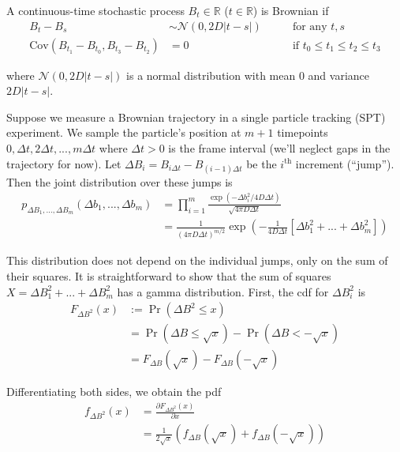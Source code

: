 \documentclass{article}
\begin{document}
A continuous-time stochastic process $B_{t} \in \mathbb{R}$ ($t \in \mathbb{R}$) is Brownian if
\begin{align}
    B_{t} - B_{s} &\sim \mathcal{N} \left( 0, 2 D \left| t - s \right| \right) \qquad &\text{for any $t, s$} \label{eq:rule1} \\
    \text{Cov} \left( B_{t_{1}} - B_{t_{0}}, B_{t_{3}} - B_{t_{2}} \right) &= 0 \qquad &\text{if $t_{0} \leq t_{1} \leq t_{2} \leq t_{3}$} \label{eq:rule2}
\end{align}

where $\mathcal{N} \left( 0, 2 D \left| t - s \right| \right)$ is a normal distribution
with mean 0 and variance $2 D \left| t - s \right|$. \newline

Suppose we measure a Brownian trajectory in a single particle tracking (SPT) experiment.
We sample the particle's position at $m+1$ timepoints
$0, \Delta t, 2 \Delta t, ..., m \Delta t$ where $\Delta t > 0$ is the
frame interval (we'll neglect gaps in the trajectory for now).
Let $\Delta B_{i} = B_{i \Delta t} - B_{(i-1) \Delta t}$ be the
$i^{\text{th}}$ increment (``jump''). Then the joint distribution over
these jumps is
\begin{align*}
    p_{\Delta B_{1}, ..., \Delta B_{m}} \left( \Delta b_{1}, ..., \Delta b_{m} \right) &= \prod\limits_{i=1}^{m} \frac{ \exp \left( - \Delta b_{i}^{2} / 4 D \Delta t \right) }{ \sqrt{ 4 \pi D \Delta t } } \\
    &= \frac{1}{\left( 4 \pi D \Delta t \right)^{m/2}} \exp \left( - \frac{1}{4 D \Delta t} \left[ \Delta b_{1}^{2} + ... + \Delta b_{m}^{2} \right] \right)
\end{align*}

This distribution does not depend on the individual jumps,
only on the sum of their squares. It is straightforward to
show that the sum of squares $X = \Delta B_{1}^{2} + ... + \Delta B_{m}^{2}$
has a gamma distribution. First, the cdf for $\Delta B_{i}^{2}$ is
\begin{align*}
    F_{\Delta B^{2}} \left( x \right) &:= \Pr \left( \Delta B^{2} \leq x \right) \\
    &= \Pr \left( \Delta B \leq \sqrt{x} \right) - \Pr \left( \Delta B < -\sqrt{x} \right) \\
    &= F_{\Delta B} \left( \sqrt{x} \right) - F_{\Delta B} \left( - \sqrt{x} \right)
\end{align*}

Differentiating both sides, we obtain the pdf
\begin{align*}
    f_{\Delta B^{2}}(x) &= \frac{\partial F_{\Delta B^{2}}(x)}{\partial x} \\
    &= \frac{1}{2 \sqrt{x}} \left(
        f_{\Delta B} \left( \sqrt{x} \right) + f_{\Delta B} \left( - \sqrt{x} \right)
    \right)
\end{align*}
\end{document}
